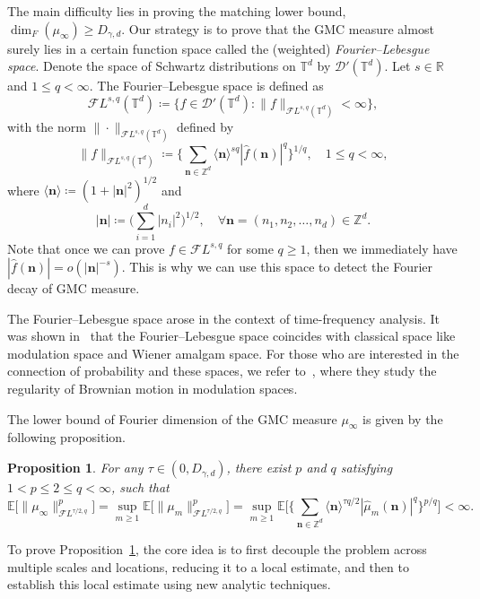 \documentclass[12pt]{amsart}
\newtheorem{proposition}[theorem]{Proposition}
\theoremstyle{definition}
\theoremstyle{remark}
\newcommand{\R}{\mathbb{R}}
\newcommand{\Z}{\mathbb{Z}}
\newcommand{\E}{\mathbb{E}}
\newcommand{\T}{\mathbb{T}}
\numberwithin{equation}{section}
\begin{document}
The main difficulty lies in proving the matching lower bound, $\dim_F(\mu_\infty) \ge D_{\gamma,d}$. Our strategy is to prove that the GMC measure almost surely lies in a certain function space called the (weighted) \textit{Fourier--Lebesgue space}.  Denote the space of Schwartz distributions on $\T^d$ by $\mathcal{D}'(\T^d)$. Let $s\in \R$ and $1\le q<\infty$. The Fourier--Lebesgue space is defined as
\[
\mathcal{F}L^{s,q}(\T^d)\coloneq \Big\{f\in \mathcal{D}'(\T^d):\|f\|_{\mathcal{F}L^{s,q}(\T^d)}<\infty\Big\}, 
\]
with the norm $\|\cdot\|_{\mathcal{F}L^{s,q}(\T^d)}$ defined by
\begin{equation}\label{eq:def-FLnorm}
\|f\|_{\mathcal{F}L^{s,q}(\T^d)}\coloneq \Big\{\sum_{\boldsymbol{n}\in \Z^d} \langle\boldsymbol{n}\rangle^{s q}|\widehat{f}(\boldsymbol{n})|^q\Big\}^{1/q},\quad 1\leq q<\infty,
\end{equation}
where \(\langle\boldsymbol{n}\rangle\coloneq (1+|\boldsymbol{n}|^2)^{1/2}\) and
\[
|\boldsymbol{n}|\coloneq \Big(\sum_{i=1}^d |n_i|^2\Big)^{1/2},\quad \forall \boldsymbol{n}=(n_1,n_2,\ldots,n_d)\in \Z^d.
\]
 Note that once we can prove $f\in \mathcal{F}L^{s,q}$ for some $q\ge 1$, then we immediately have $|\widehat{f}(\boldsymbol{n})|=o(|\boldsymbol{n}|^{-s})$. This is why we can use this space to detect the Fourier decay of GMC measure. 

The Fourier--Lebesgue space arose in the context of time-frequency analysis. It was shown in~\cite[Proposition~2.1 and Remark 4.2]{RSTT11} that the Fourier--Lebesgue space coincides with classical space like modulation space and Wiener amalgam space. For those who are interested in the connection of probability and these spaces, we refer to~\cite{BO11}, where they study the regularity of Brownian motion in modulation spaces.

The lower bound of Fourier dimension of the GMC measure \(\mu_\infty\) is given by the following proposition.
\begin{proposition}\label{prop:uniform-boundedness-Fourier-Lebesgue-norm}
For any $\tau\in (0,D_{\gamma,d})$, there exist $p$ and $q$ satisfying $1<p\le 2\le q<\infty$, such that
\[
\mathbb{E}\big[\|\mu_\infty\|_{\mathcal{F}L^{\tau/2,q}}^p\big]=\sup_{m\ge 1}\E\big[\|\mu_m\|_{\mathcal{F}L^{\tau/2,q}}^p\big]=\sup_{m\ge 1}\E\Big[\Big\{\sum_{\boldsymbol{n}\in \Z^d} \langle\boldsymbol{n}\rangle^{\tau q/2}|\widehat{\mu}_m(\boldsymbol{n})|^q\Big\}^{p/q}\Big]<\infty.
\]
\end{proposition}

To prove Proposition~\ref{prop:uniform-boundedness-Fourier-Lebesgue-norm}, the core idea is to first decouple the problem across multiple scales and locations, reducing it to a local estimate, and then to establish this local estimate using new analytic techniques.
\end{document}
